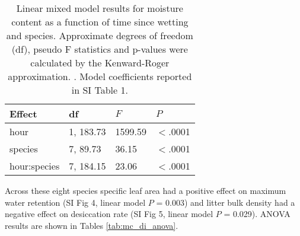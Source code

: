 \documentclass[letterpaper,12pt]{article}
\begin{document}
\begin{table}[h]
  \caption{Linear mixed model results for moisture content as a function of
    time since wetting and species. Approximate degrees of freedom (df), pseudo F
    statistics and p-values were calculated by the Kenward-Roger approximation.
    \citep{Kenward_Roger-1997}. Model coefficients reported in SI Table 1.}
  \label{tab:drydown}
\centering
\begin{tabular}{llll}
  \toprule
Effect & df & $F$ & $P$ \\ 
  \midrule
  hour & 1, 183.73 & 1599.59 & $<$.0001 \\ 
  species & 7, 89.73 & 36.15 & $<$.0001 \\ 
  hour:species & 7, 184.15 & 23.06 & $<$.0001 \\ 
   \bottomrule
\end{tabular}
\end{table}

Across these eight species specific leaf area had a positive effect on maximum
water retention (SI Fig 4, linear model $P$ = 0.003) and litter
bulk density had a negative effect on desiccation rate (SI Fig 5,
linear model $P$ = 0.029). ANOVA results are shown in Tables
\ref{tab:mc_di_anova}.
\end{document}
